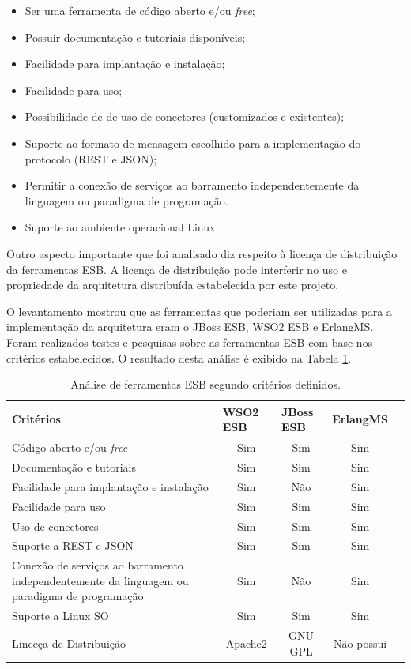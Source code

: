 \begin{itemize}
\item Ser uma ferramenta de código aberto e/ou \textit{free};
\item Possuir documentação e tutoriais disponíveis;
\item Facilidade para implantação e instalação;
\item Facilidade para uso;
\item Possibilidade de de uso de conectores (customizados e existentes);
\item Suporte ao formato de mensagem escolhido para a implementação do protocolo (REST e JSON);
\item Permitir a conexão de serviços ao barramento independentemente da linguagem ou paradigma de programação.
\item Suporte ao ambiente operacional Linux.
\end{itemize}

Outro aspecto importante que foi analisado diz respeito à licença de distribuição da ferramentas ESB. A licença de distribuição pode interferir no uso e propriedade da arquitetura distribuída estabelecida por este projeto.

O levantamento mostrou que as ferramentas que poderiam ser utilizadas para a implementação da arquitetura eram o JBoss ESB, WSO2 ESB e ErlangMS. Foram realizados testes e pesquisas sobre as ferramentas ESB com base nos critérios estabelecidos. O resultado desta análise é exibido na Tabela \ref{analise_ferramentas}.


\begin{table}[!h]
\centering
\caption{Análise de ferramentas ESB segundo critérios definidos.}
\label{analise_ferramentas}
\begin{tabular}{|p{9cm}|c|c|c|c|}
\hline
Critérios & \multicolumn{1}{l|}{WSO2 ESB} & \multicolumn{1}{l|}{JBoss ESB} & \multicolumn{1}{l|}{ErlangMS} \\ \hline
Código aberto e/ou \textit{free} & Sim & Sim & Sim \\ \hline
Documentação e tutoriais         & Sim & Sim & Sim \\ \hline
Facilidade para implantação e instalação     & Sim & Não & Sim \\ \hline
Facilidade para uso              & Sim & Sim & Sim \\ \hline
Uso de conectores                & Sim & Sim & Sim \\ \hline
Suporte a REST e JSON            & Sim & Sim & Sim \\ \hline
Conexão de serviços ao barramento independentemente da linguagem ou paradigma de programação & Sim & Não & Sim \\ \hline
Suporte a Linux SO               & Sim & Sim & Sim\\ \hline
Linceça de Distribuição          & Apache2 & GNU GPL & Não possui \\ \hline
\end{tabular}
\end{table}

